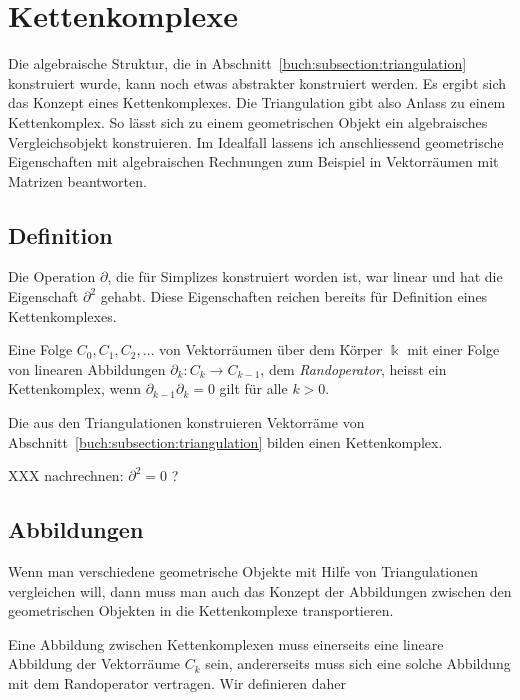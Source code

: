 %
%
%
\section{Kettenkomplexe
\label{buch:section:komplex}}
Die algebraische Struktur, die in Abschnitt~\ref{buch:subsection:triangulation}
konstruiert wurde, kann noch etwas abstrakter konstruiert werden.
Es ergibt sich das Konzept eines Kettenkomplexes.
Die Triangulation gibt also Anlass zu einem Kettenkomplex.
So lässt sich zu einem geometrischen Objekt ein algebraisches 
Vergleichsobjekt konstruieren.
Im Idealfall lassens ich anschliessend geometrische Eigenschaften mit
algebraischen Rechnungen zum Beispiel in Vektorräumen mit Matrizen
beantworten.

\subsection{Definition
\label{buch:subsection:kettenkomplex-definition}}
Die Operation $\partial$, die für Simplizes konstruiert worden ist,
war linear und hat die Eigenschaft $\partial^2$ gehabt.
Diese Eigenschaften reichen bereits für Definition eines Kettenkomplexes.

\begin{definition}
Eine Folge $C_0,C_1,C_2,\dots$ von Vektorräumen über dem Körper $\Bbbk$
mit einer Folge von linearen Abbildungen
$\partial_k\colon C_k \to C_{k-1}$, dem {\em Randoperator},
heisst ein Kettenkomplex, wenn $\partial_{k-1}\partial_k=0$ gilt
für alle $k>0$.
\end{definition}

Die aus den Triangulationen konstruieren Vektorräme von
Abschnitt~\ref{buch:subsection:triangulation} bilden einen
Kettenkomplex.

XXX nachrechnen: $\partial^2 = 0$ ?

\subsection{Abbildungen
\label{buch:subsection:abbildungen}}
Wenn man verschiedene geometrische Objekte mit Hilfe von Triangulationen
vergleichen will, dann muss man auch das Konzept der Abbildungen zwischen
den geometrischen Objekten in die Kettenkomplexe transportieren.

Eine Abbildung zwischen Kettenkomplexen muss einerseits eine lineare
Abbildung der Vektorräume $C_k$ sein, andererseits muss sich eine
solche Abbildung mit dem Randoperator vertragen.
Wir definieren daher


